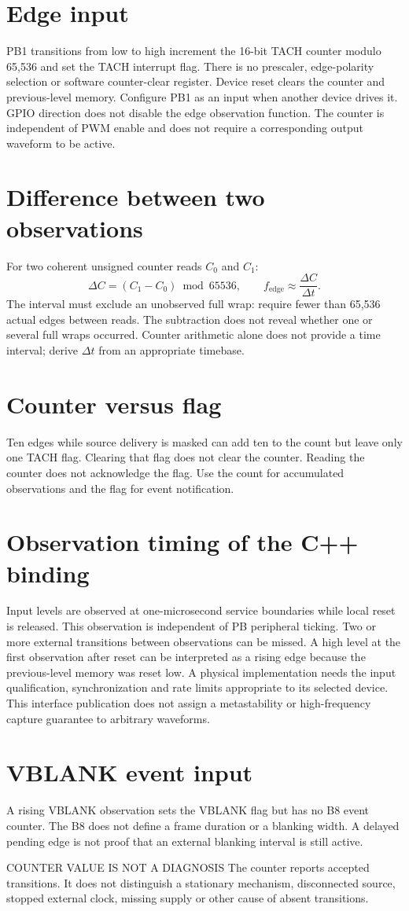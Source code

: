 \documentclass[10pt]{article}
\begin{document}
\section*{Edge input}
PB1 transitions from low to high increment the 16-bit TACH counter modulo 65,536 and set the TACH interrupt flag. There is no prescaler, edge-polarity selection or software counter-clear register. Device reset clears the counter and previous-level memory.
Configure PB1 as an input when another device drives it. GPIO direction does not disable the edge observation function. The counter is independent of PWM enable and does not require a corresponding output waveform to be active.
\section*{Difference between two observations}
For two coherent unsigned counter reads $C_0$ and $C_1$:
\[
 \Delta C=(C_1-C_0)\bmod 65536,\qquad
 f_{\mathrm{edge}}\approx\frac{\Delta C}{\Delta t}.
\]
The interval must exclude an unobserved full wrap: require fewer than 65,536 actual edges between reads. The subtraction does not reveal whether one or several full wraps occurred. Counter arithmetic alone does not provide a time interval; derive $\Delta t$ from an appropriate timebase.
\section*{Counter versus flag}
Ten edges while source delivery is masked can add ten to the count but leave only one TACH flag. Clearing that flag does not clear the counter. Reading the counter does not acknowledge the flag. Use the count for accumulated observations and the flag for event notification.
\section*{Observation timing of the C++ binding}
Input levels are observed at one-microsecond service boundaries while local reset is released. This observation is independent of PB peripheral ticking. Two or more external transitions between observations can be missed. A high level at the first observation after reset can be interpreted as a rising edge because the previous-level memory was reset low.
A physical implementation needs the input qualification, synchronization and rate limits appropriate to its selected device. This interface publication does not assign a metastability or high-frequency capture guarantee to arbitrary waveforms.
\section*{VBLANK event input}
A rising VBLANK observation sets the VBLANK flag but has no B8 event counter. The B8 does not define a frame duration or a blanking width. A delayed pending edge is not proof that an external blanking interval is still active.
\begin{Notice}{COUNTER VALUE IS NOT A DIAGNOSIS}
The counter reports accepted transitions. It does not distinguish a stationary mechanism, disconnected source, stopped external clock, missing supply or other cause of absent transitions.
\end{Notice}
\end{document}
